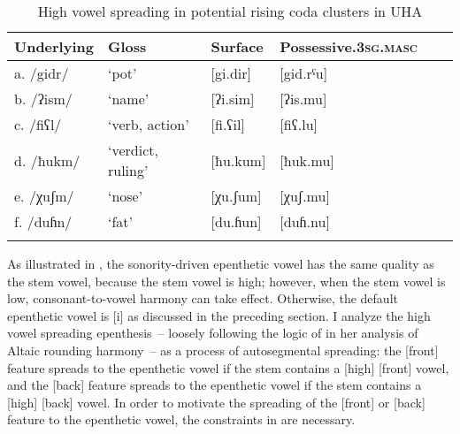 \documentclass[output=paper,colorlinks,citecolor=brown]{langscibook}
\begin{document}
\begin{table}
\caption{High vowel spreading in potential rising coda clusters in UHA}
\label{table:highV}
\begin{tabular}{llllll}
\lsptoprule
Underlying & Gloss & Surface & Possessive.3\textsc{sg}.\textsc{masc} \\
\midrule
a. /gidr/   &   ‘pot’   &           [gi.dir]    &   [gid.rˤu] \\
b. /ʔism/   &   ‘name’  &           [ʔi.sim]    &   [ʔis.mu] \\
c. /fiʕl/	&   ‘verb, action’	&  [fi.ʕil]	      &  [fiʕ.lu] \\
d. /ħukm/   &	‘verdict, ruling’ &	[ħu.kum]	&    [ħuk.mu] \\
e. /χuʃm/   &	‘nose’	&          [χu.ʃum]	   &   [χuʃ.mu] \\
f. /duɦn/   &	‘fat’	&           [du.ɦun]    &	[duɦ.nu]\\
\lspbottomrule                
\end{tabular}
\end{table}


As illustrated in , the sonority-driven epenthetic vowel has the same quality as the stem vowel, because the stem vowel is high; however, when the stem vowel is low, consonant-to-vowel harmony can take effect. Otherwise, the default epenthetic vowel is [i] as discussed in the preceding section. I analyze the high vowel spreading epenthesis~-- loosely following the logic of \citet{Walker2001} in her analysis of Altaic rounding harmony~-- as a process of autosegmental spreading: the [front] feature spreads to the epenthetic vowel if the stem contains a [high] [front] vowel, and the [back] feature spreads to the epenthetic vowel if the stem contains a [high] [back] vowel. In order to motivate the spreading of the [front] or [back] feature to the epenthetic vowel, the constraints in  are necessary. 
\end{document}
